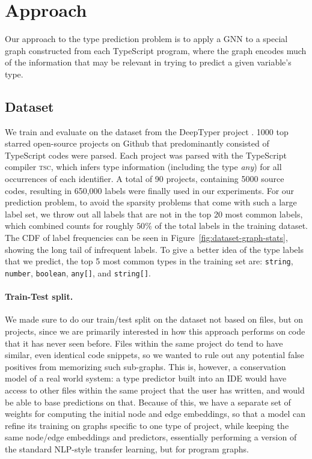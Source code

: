 \section{Approach}
\label{sec:approach}

Our approach to the type prediction problem is to apply a GNN to a special graph constructed from each TypeScript program, where the graph encodes much of the information that may be relevant in trying to predict a given variable's type.

\subsection{Dataset}
\label{sec:dataset}
We train and evaluate on the dataset from the DeepTyper project \cite{hellendoorn2018deep}. 1000 top starred open-source projects on Github that predominantly consisted of TypeScript codes were parsed. Each project was parsed with the TypeScript compiler \textsc{tsc}, which infers type information (including the type \textit{any}) for all occurrences of each identifier. A total of 90 projects, containing 5000 source codes, resulting in 650,000 labels were finally used in our experiments.
For our prediction problem, to avoid the sparsity problems that come with such a large label set, we throw out all labels that are not in the top 20 most common labels, which combined counts for roughly $50\%$ of the total labels in the training dataset.
The CDF of label frequencies can be seen in Figure~\ref{fig:dataset-graph-stats}, showing the long tail of infrequent labels.
To give a better idea of the type labels that we predict, the top 5 most common types in the training set are: \texttt{string}, \texttt{number}, \texttt{boolean}, \texttt{any[]}, and \texttt{string[]}.

\paragraph{Train-Test split.}

We made sure to do our train/test split on the dataset not based on files, but on projects, since we are primarily interested in how this approach performs on code that it has never seen before.
Files within the same project do tend to have similar, even identical code snippets, so we wanted to rule out any potential false positives from memorizing such sub-graphs.
This is, however, a conservation model of a real world system: a type predictor built into an IDE would have access to other files within the same project that the user has written, and would be able to base predictions on that.
Because of this, we have a separate set of weights for computing the initial node and edge embeddings, so that a model can refine its training on graphs specific to one type of project, while keeping the same node/edge embeddings and predictors, essentially performing a version of the standard NLP-style transfer learning, but for program graphs.

